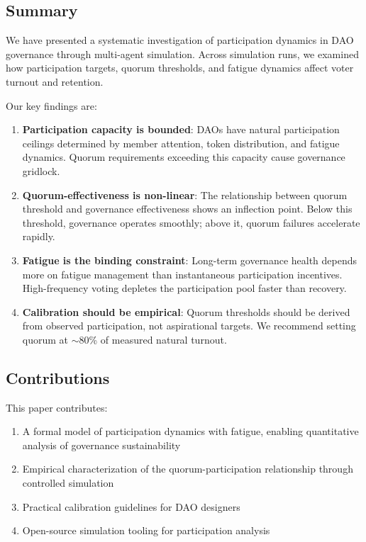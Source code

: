 
\subsection{Summary}

We have presented a systematic investigation of participation dynamics in DAO governance through multi-agent simulation. Across \experimentruns{} simulation runs, we examined how participation targets, quorum thresholds, and fatigue dynamics affect voter turnout and retention.

Our key findings are:

\begin{enumerate}
    \item \textbf{Participation capacity is bounded}: DAOs have natural participation ceilings determined by member attention, token distribution, and fatigue dynamics. Quorum requirements exceeding this capacity cause governance gridlock.

    \item \textbf{Quorum-effectiveness is non-linear}: The relationship between quorum threshold and governance effectiveness shows an inflection point. Below this threshold, governance operates smoothly; above it, quorum failures accelerate rapidly.

    \item \textbf{Fatigue is the binding constraint}: Long-term governance health depends more on fatigue management than instantaneous participation incentives. High-frequency voting depletes the participation pool faster than recovery.

    \item \textbf{Calibration should be empirical}: Quorum thresholds should be derived from observed participation, not aspirational targets. We recommend setting quorum at $\sim$80\% of measured natural turnout.
\end{enumerate}

\subsection{Contributions}

This paper contributes:

\begin{enumerate}
    \item A formal model of participation dynamics with fatigue, enabling quantitative analysis of governance sustainability
    \item Empirical characterization of the quorum-participation relationship through controlled simulation
    \item Practical calibration guidelines for DAO designers
    \item Open-source simulation tooling for participation analysis
\end{enumerate}

